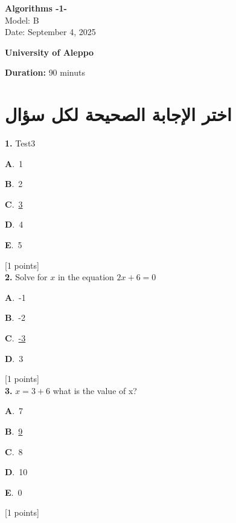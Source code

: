 \documentclass[12pt]{article}
\newcommand{\choice}[3]{%
  \noindent\textbf{#1}.~#2\hfill#3\par\vspace{0.25em}
}
\begin{document}
\begin{flushright}
{\Large \textbf{{\textenglish{Algorithms -1-}}}}\\[0.25em]
{\normalsize \textenglish{Model: }{\textenglish{B}}}\\[0.1em]
{\normalsize \textenglish{Date: }{\textenglish{September 4, 2025}}}
\end{flushright}

\vspace{0.6cm}

\noindent
\begin{minipage}[t]{0.65\textwidth}
  \raggedright
  \textbf{{\textenglish{University of Aleppo}}}\\[0.3em]
\end{minipage}\hfill
\begin{minipage}[t]{0.3\textwidth}
  \raggedleft
  \textenglish{\textbf{Duration: }}{\textenglish{90 minuts}}
\end{minipage}

\vspace{0.9cm}

\section*{اختر الإجابة الصحيحة لكل سؤال}

\noindent \textbf{\textenglish{1.}} {\textenglish{Test3}}

\noindent\choice{A}{{\textenglish{1}}}{}
\noindent\choice{B}{{\textenglish{2}}}{}
\noindent\choice{C}{\underline{{\textenglish{3}}}}{}
\noindent\choice{D}{{\textenglish{4}}}{}
\noindent\choice{E}{{\textenglish{5}}}{}
\hfill {\textenglish{[1 points]}}\\[0.5em]

\noindent \textbf{\textenglish{2.}} {\textenglish{Solve for }}\(x \){\textenglish{ in the equation }}\(2x+6 = 0 \)

\noindent\choice{A}{{\textenglish{-1}}}{}
\noindent\choice{B}{{\textenglish{-2}}}{}
\noindent\choice{C}{\underline{{\textenglish{-3}}}}{}
\noindent\choice{D}{{\textenglish{3}}}{}
\hfill {\textenglish{[1 points]}}\\[0.5em]

\noindent \textbf{\textenglish{3.}} \(x=3+6 \){\textenglish{ what is the value of x?}}

\noindent\choice{A}{{\textenglish{7}}}{}
\noindent\choice{B}{\underline{{\textenglish{9}}}}{}
\noindent\choice{C}{{\textenglish{8}}}{}
\noindent\choice{D}{{\textenglish{10}}}{}
\noindent\choice{E}{{\textenglish{0}}}{}
\hfill {\textenglish{[1 points]}}\\[0.5em]
\end{document}
